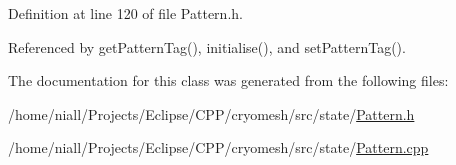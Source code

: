 \-Definition at line 120 of file \-Pattern.\-h.



\-Referenced by get\-Pattern\-Tag(), initialise(), and set\-Pattern\-Tag().



\-The documentation for this class was generated from the following files\-:\begin{DoxyCompactItemize}
\item 
/home/niall/\-Projects/\-Eclipse/\-C\-P\-P/cryomesh/src/state/\hyperlink{Pattern_8h}{\-Pattern.\-h}\item 
/home/niall/\-Projects/\-Eclipse/\-C\-P\-P/cryomesh/src/state/\hyperlink{Pattern_8cpp}{\-Pattern.\-cpp}\end{DoxyCompactItemize}
